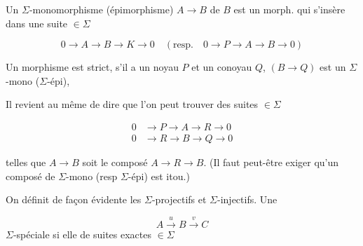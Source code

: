 
Un $\Sigma$-monomorphisme (épimorphisme) $A\longrightarrow B$ de $B$ est un morph. qui s'insère dans une suite $\in\Sigma$

\[
 0\longrightarrow A\longrightarrow B\longrightarrow K\longrightarrow0\quad(\text{resp.}\quad0\longrightarrow P\longrightarrow A\longrightarrow B\longrightarrow0)
\]

Un morphisme   est \inserted{$\Sigma$-}strict, s'il a un noyau $P$ et un conoyau $Q$, \deleted{\unsure{et si|objet} $[\operatorname{Coim}\overset{\sim}{\longrightarrow}\operatorname{Im}$,}  $(B\longrightarrow Q)$ est un $\Sigma$-mono ($\Sigma$-épi),


Il revient au même de dire que l'on peut trouver des suites $\in\Sigma$

\[
 \begin{aligned}
 0&\longrightarrow P\longrightarrow A\longrightarrow R\longrightarrow0\\
 0&\longrightarrow R\longrightarrow B\longrightarrow Q\longrightarrow0
 \end{aligned}
\]

telles que $A\longrightarrow B$ soit le composé $A\to R\longrightarrow B$. (Il faut peut-être exiger qu'un composé de $\Sigma$-mono (resp $\Sigma$-épi) est itou.)

On définit de façon évidente les  $\Sigma$-projectifs et $\Sigma$-injectifs. Une  


\[
 A\xrightarrow{u}B\xrightarrow{v}C
\]
 $\Sigma$-spéciale  si elle   de suites exactes $\in\Sigma$


